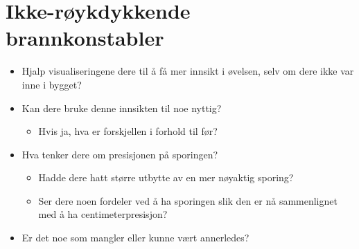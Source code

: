 \documentclass[../Main/thesis.tex]{subfiles}
\begin{document}
\section*{Ikke-røykdykkende brannkonstabler}
\begin{itemize}
	\item Hjalp visualiseringene dere til å få mer innsikt i øvelsen, selv om dere ikke var inne i bygget?
	\item Kan dere bruke denne innsikten til noe nyttig?
\begin{itemize}
	\item Hvis ja, hva er forskjellen i forhold til før?
\end{itemize}
\item Hva tenker dere om presisjonen på sporingen?
\begin{itemize}
	\item Hadde dere hatt større utbytte av en mer nøyaktig sporing?
	\item Ser dere noen fordeler ved å ha sporingen slik den er nå sammenlignet med å ha centimeterpresisjon?
\end{itemize}
\item Er det noe som mangler eller kunne vært annerledes?
\end{itemize}
\end{document}
